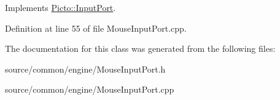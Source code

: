 Implements \hyperlink{class_picto_1_1_input_port_a885502b8712d339b918ac0c6ba418957}{Picto\-::\-Input\-Port}.



Definition at line 55 of file Mouse\-Input\-Port.\-cpp.



The documentation for this class was generated from the following files\-:\begin{DoxyCompactItemize}
\item 
source/common/engine/Mouse\-Input\-Port.\-h\item 
source/common/engine/Mouse\-Input\-Port.\-cpp\end{DoxyCompactItemize}
